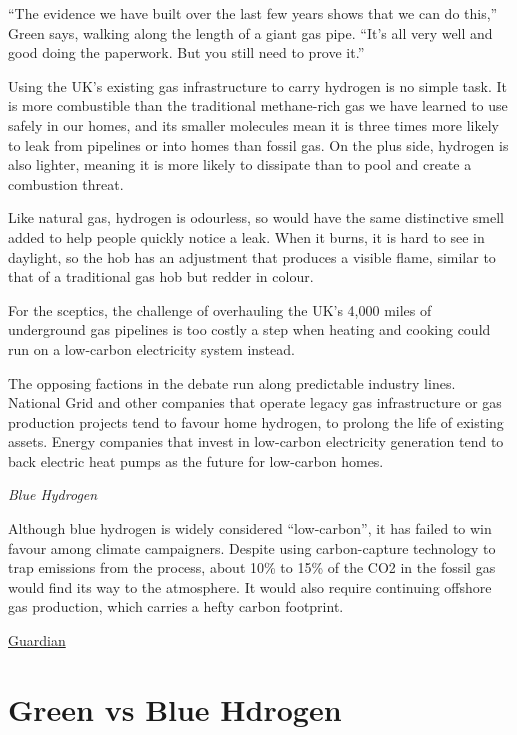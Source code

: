\documentclass[
]{book}
\begin{document}
``The evidence we have built over the last few years shows that we can do this,'' Green says, walking along the length of a giant gas pipe. ``It's all very well and good doing the paperwork. But you still need to prove it.''

Using the UK's existing gas infrastructure to carry hydrogen is no simple task. It is more combustible than the traditional methane-rich gas we have learned to use safely in our homes, and its smaller molecules mean it is three times more likely to leak from pipelines or into homes than fossil gas. On the plus side, hydrogen is also lighter, meaning it is more likely to dissipate than to pool and create a combustion threat.

Like natural gas, hydrogen is odourless, so would have the same distinctive smell added to help people quickly notice a leak. When it burns, it is hard to see in daylight, so the hob has an adjustment that produces a visible flame, similar to that of a traditional gas hob but redder in colour.

For the sceptics, the challenge of overhauling the UK's 4,000 miles of underground gas pipelines is too costly a step when heating and cooking could run on a low-carbon electricity system instead.

The opposing factions in the debate run along predictable industry lines. National Grid and other companies that operate legacy gas infrastructure or gas production projects tend to favour home hydrogen, to prolong the life of existing assets. Energy companies that invest in low-carbon electricity generation tend to back electric heat pumps as the future for low-carbon homes.

\emph{Blue Hydrogen}

Although blue hydrogen is widely considered ``low-carbon'', it has failed to win favour among climate campaigners. Despite using carbon-capture technology to trap emissions from the process, about 10\% to 15\% of the CO2 in the fossil gas would find its way to the atmosphere. It would also require continuing offshore gas production, which carries a hefty carbon footprint.

\href{https://www.theguardian.com/environment/2021/oct/30/hydrogen-high-street-could-these-homes-change-the-way-we-keep-warm}{Guardian}

\hypertarget{green-vs-blue-hdrogen}{%
\section{Green vs Blue Hdrogen}\label{green-vs-blue-hdrogen}}
\end{document}
